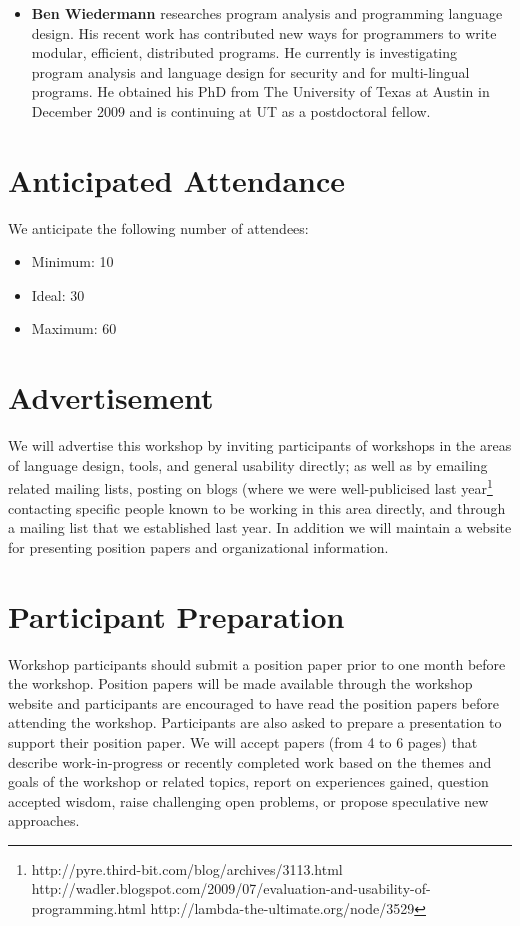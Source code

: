 \documentclass[authorpermission]{sigplanconf}
\begin{document}
\begin{itemize}
\item \textbf{Ben Wiedermann} researches program analysis and programming language  
design. His recent work has contributed new ways for programmers to  
write modular, efficient, distributed programs. He currently is  
investigating program analysis and language design for security and  
for multi-lingual programs. He obtained his PhD from The University of  
Texas at Austin in December 2009 and is continuing at UT as a  
postdoctoral fellow.

\end{itemize}

\section{Anticipated Attendance}

We anticipate the following number of attendees:

\begin{itemize}
\item Minimum: 10 
\item Ideal: 30
\item Maximum: 60 
\end{itemize}

\section{Advertisement}

We will advertise this workshop by inviting participants of workshops
in the areas of language design, tools, and general usability
directly; as well as by emailing related mailing lists, posting on
blogs (where we were well-publicised last
year\footnote{http://pyre.third-bit.com/blog/archives/3113.html
http://wadler.blogspot.com/2009/07/evaluation-and-usability-of-programming.html
http://lambda-the-ultimate.org/node/3529}
contacting specific people known to be working in this area directly,
and through a mailing list that we established last year. In
addition we will maintain a website for presenting position papers and organizational
information.

\section{Participant Preparation}

Workshop participants should submit a position paper prior to one
month before the workshop. Position papers will be made available
through the workshop website and participants are encouraged to have
read the position papers before attending the workshop. Participants
are also asked to prepare a presentation to support their position
paper. We will accept papers (from 4 to 6 pages) that describe
work-in-progress or recently completed work based on the themes and
goals of the workshop or related topics, report on experiences gained,
question accepted wisdom, raise challenging open problems, or propose
speculative new approaches.
\end{document}
